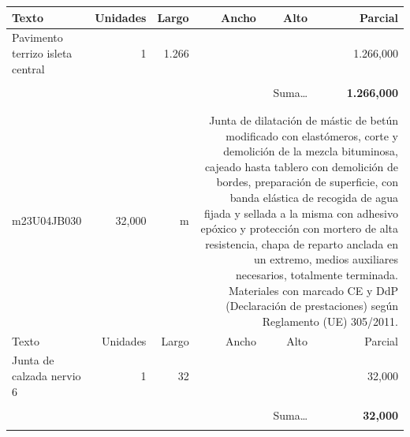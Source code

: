 \documentclass{book}%
\begin{document}
\begin{longtable}{lrrrrr}
Texto&Unidades&Largo&Ancho&Alto&Parcial\\%
\hline%
\multicolumn{1}{p{3.5cm}}{Pavimento terrizo isleta central}&1&1.266&&& 1.266,000\\%
&&&&&\\%
\multicolumn{5}{r}{Suma\ldots}&\textbf{ 1.266,000}\\%
\hline%
&&&&&\\%
&&&&&\\%
m23U04JB030&    32,000& m&\multicolumn{3}{p{6cm}}{\scriptsize Junta de dilatación de mástic de betún modificado con elastómeros, corte y demolición de la mezcla bituminosa, cajeado hasta tablero con demolición de bordes, preparación de superficie, con banda elástica de recogida de agua fijada y sellada a la misma con adhesivo epóxico y protección con mortero de alta resistencia, chapa de reparto anclada en un extremo, medios auxiliares necesarios, totalmente terminada. Materiales con marcado CE y DdP (Declaración de prestaciones) según Reglamento (UE) 305/2011.\normalsize}\\%
Texto&Unidades&Largo&Ancho&Alto&Parcial\\%
\hline%
\multicolumn{1}{p{3.5cm}}{Junta de calzada nervio 6 }&1&32&&&    32,000\\%
&&&&&\\%
\multicolumn{5}{r}{Suma\ldots}&\textbf{    32,000}\\%
\hline%
&&&&&\\%
\end{longtable}%
\newpage

%
\end{document}

